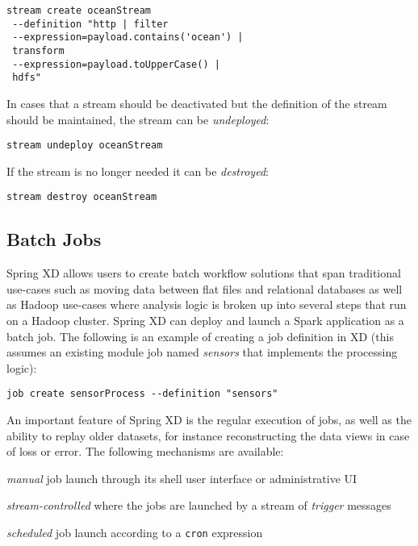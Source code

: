 \begin{lstlisting}
stream create oceanStream 
 --definition "http | filter
 --expression=payload.contains('ocean') |
 transform
 --expression=payload.toUpperCase() |
 hdfs"
\end{lstlisting}

In cases that a stream should be deactivated but the definition of the stream
should be maintained, the stream can be \emph{undeployed}:

\begin{lstlisting}
stream undeploy oceanStream
\end{lstlisting}

If the stream is no longer needed it can be \emph{destroyed}:

\begin{lstlisting}
stream destroy oceanStream
\end{lstlisting}

\subsection {Batch Jobs}

Spring XD allows users to create batch workflow solutions that span traditional
use-cases such as moving data between flat files and relational databases as
well as Hadoop use-cases where analysis logic is broken up into several steps
that run on a Hadoop cluster. Spring XD can deploy and launch a Spark application
as a batch job. The following is an example of creating a
job definition in XD (this assumes an existing module job named \emph{sensors} that
implements the processing logic):

\begin{lstlisting}
job create sensorProcess --definition "sensors"
\end{lstlisting}

An important feature of Spring XD is the regular
execution of jobs, as well as the ability to replay older datasets, for
instance reconstructing the data views in case of loss or error.
The following mechanisms are available:

\begin{itemize*}
\item \emph{manual} job launch through its shell user interface or
administrative UI
\item \emph{stream-controlled} where the jobs are launched by a stream of
\emph{trigger} messages
\item \emph{scheduled} job launch according to a \texttt{cron} expression
\end{itemize*}

